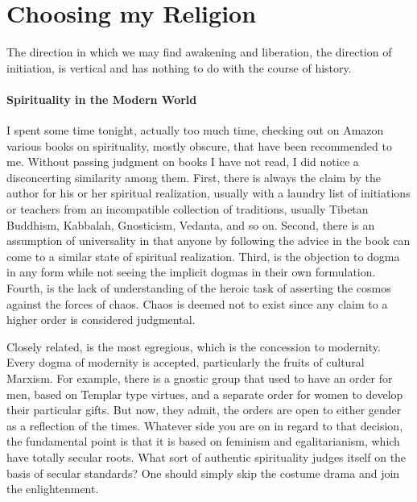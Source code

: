 \section{Choosing my Religion}

\begin{quotex}
The direction in which we may find awakening and liberation, the direction of initiation, is vertical and has nothing to do with the course of history.
\end{quotex}


\paragraph{Spirituality in the Modern World}


I spent some time tonight, actually too much time, checking out on Amazon various books on spirituality, mostly obscure, that have been recommended to me. Without passing judgment on books I have not read, I did notice a disconcerting similarity among them. First, there is always the claim by the author for his or her spiritual realization, usually with a laundry list of initiations or teachers from an incompatible collection of traditions, usually Tibetan Buddhism, Kabbalah, Gnosticism, Vedanta, and so on. Second, there is an assumption of universality in that anyone by following the advice in the book can come to a similar state of spiritual realization. Third, is the objection to dogma in any form while not seeing the implicit dogmas in their own formulation. Fourth, is the lack of understanding of the heroic task of asserting the cosmos against the forces of chaos. Chaos is deemed not to exist since any claim to a higher order is considered judgmental.

Closely related, is the most egregious, which is the concession to modernity. Every dogma of modernity is accepted, particularly the fruits of cultural Marxism. For example, there is a gnostic group that used to have an order for men, based on Templar type virtues, and a separate order for women to develop their particular gifts. But now, they admit, the orders are open to either gender as a reflection of the times. Whatever side you are on in regard to that decision, the fundamental point is that it is based on feminism and egalitarianism, which have totally secular roots. What sort of authentic spirituality judges itself on the basis of secular standards? One should simply skip the costume drama and join the enlightenment.

